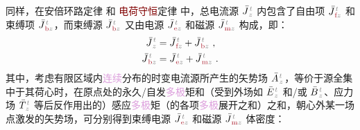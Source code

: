 同样，在安倍环路定律  和 \textcolor{Maroon}{电荷守恒}定律  中，总电流源 $\bar{J}^{\;\!\mathcolor{gray}{t}}_{\;\!\mathcolor{gray}{z}}$ 内包含了自由项 $\bar{J}^{\;\!\mathcolor{gray}{t}}_{\;\!\textcolor{Maroon}{\text{f}}\mathcolor{gray}{z}}$ 和束缚项 $\bar{J}^{\;\!\mathcolor{gray}{t}}_{\;\!\textcolor{Maroon}{\text{b}}\mathcolor{gray}{z}}$\cite{langeMultipoleTheoryHehl2015,raabMultipoleTheoryElectromagnetism2004}，而束缚源 $\bar{J}^{\;\!\mathcolor{gray}{t}}_{\;\!\textcolor{Maroon}{\text{b}}\mathcolor{gray}{z}}$ 又由电源 $\bar{J}^{\;\!\mathcolor{gray}{t}}_{\;\!\textcolor{Maroon}{\text{e}}\mathcolor{gray}{z}}$ 和磁源 $\bar{J}^{\;\!\mathcolor{gray}{t}}_{\;\!\textcolor{Maroon}{\text{m}}\mathcolor{gray}{z}}$ 构成，即：
\begin{subequations} \label{eq:j-fbem}
	\abovedisplayskip=2pt
	\belowdisplayskip=10pt
\begin{align}
	\bar{J}^{\;\!\mathcolor{gray}{t}}_{\;\!\mathcolor{gray}{z}} &= \bar{J}^{\;\!\mathcolor{gray}{t}}_{\;\!\textcolor{Maroon}{\text{f}}\mathcolor{gray}{z}} + \bar{J}^{\;\!\mathcolor{gray}{t}}_{\;\!\textcolor{Maroon}{\text{b}}\mathcolor{gray}{z}}~, \label{eq:j=f+b} \\ \bar{J}^{\;\!\mathcolor{gray}{t}}_{\;\!\textcolor{Maroon}{\text{b}}\mathcolor{gray}{z}} &= \bar{J}^{\;\!\mathcolor{gray}{t}}_{\;\!\textcolor{Maroon}{\text{e}}\mathcolor{gray}{z}} + \bar{J}^{\;\!\mathcolor{gray}{t}}_{\;\!\textcolor{Maroon}{\text{m}}\mathcolor{gray}{z}}~. \label{eq:b=e+m}
\end{align}
\end{subequations}
其中，考虑有限区域内\textcolor{Plum}{连续}分布的时变电流源所产生的矢势场 $\bar{A}^{\;\!\mathcolor{gray}{t}}_{\;\!\mathcolor{gray}{z}}$，等价于源全集中于其荷心时，在原点处的永久/自发\textcolor{Plum}{多极}矩和（受到外场如 $\bar{E}^{\;\!\mathcolor{gray}{t}}_{\;\!\mathcolor{gray}{z}}$ 和/或 $\bar{B}^{\;\!\mathcolor{gray}{t}}_{\;\!\mathcolor{gray}{z}}$、应力场 $\bar{T}^{\;\!\mathcolor{gray}{t}}_{\;\!\mathcolor{gray}{z}}$ 等后反作用出的）感应\textcolor{Plum}{多极}矩（的各项\textcolor{Plum}{多极}展开之和）之和，朝心外某一场点激发的矢势场\cite{raabMultipoleTheoryElectromagnetism2004,delangeTranslationalInvariancePost2012,chen-zhuChenZhuxieUndergraduate_courses2024}，可分别得到束缚电源 $\bar{J}^{\;\!\mathcolor{gray}{t}}_{\;\!\textcolor{Maroon}{\text{e}}\mathcolor{gray}{z}}$ 和磁源 $\bar{J}^{\;\!\mathcolor{gray}{t}}_{\;\!\textcolor{Maroon}{\text{m}}\mathcolor{gray}{z}}$ 体密度：
